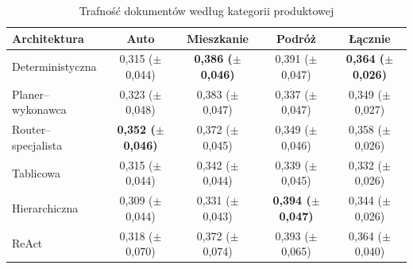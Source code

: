   \begin{table}[H]
    \caption{Trafność dokumentów według kategorii produktowej}\label{tab:trafnosc-kategoria}
    \centering
    \small
    \renewcommand{\arraystretch}{1.3}
    \begin{tabular}{@{} l c c c c @{}}
      \toprule
      \textbf{Architektura}
      & \textbf{Auto}
      & \textbf{Mieszkanie}
      & \textbf{Podróż}
      & \textbf{Łącznie}                                                                                                                              \\
      \midrule
      Deterministyczna    & 0{,}315 (\(\pm\) 0{,}044)          & \textbf{0{,}386 (\(\pm\) 0{,}046)} & 0{,}391 (\(\pm\) 0{,}047)          & \textbf{0{,}364 (\(\pm\) 0{,}026)} \\
      Planer--wykonawca   & 0{,}323 (\(\pm\) 0{,}048)          & 0{,}383 (\(\pm\) 0{,}047)          & 0{,}337 (\(\pm\) 0{,}047)          & 0{,}349 (\(\pm\) 0{,}027)          \\
      Router--specjalista & \textbf{0{,}352 (\(\pm\) 0{,}046)} & 0{,}372 (\(\pm\) 0{,}045)          & 0{,}349 (\(\pm\) 0{,}046)          & 0{,}358 (\(\pm\) 0{,}026)          \\
      Tablicowa           & 0{,}315 (\(\pm\) 0{,}044)          & 0{,}342 (\(\pm\) 0{,}044)          & 0{,}339 (\(\pm\) 0{,}045)          & 0{,}332 (\(\pm\) 0{,}026)          \\
      Hierarchiczna       & 0{,}309 (\(\pm\) 0{,}044)          & 0{,}331 (\(\pm\) 0{,}043)          & \textbf{0{,}394 (\(\pm\) 0{,}047)} & 0{,}344 (\(\pm\) 0{,}026)          \\
      ReAct               & 0{,}318 (\(\pm\) 0{,}070)          & 0{,}372 (\(\pm\) 0{,}074)          & 0{,}393 (\(\pm\) 0{,}065)          & 0{,}364 (\(\pm\) 0{,}040)          \\
      \bottomrule
    \end{tabular}
  \end{table}

